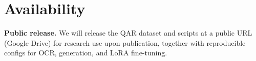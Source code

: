 \documentclass[sigconf,authordraft,anonymous]{acmart}
\begin{document}
\section{Availability}
\textbf{Public release.} We will release the QAR dataset and scripts at a public URL (Google Drive) for research use upon publication, together with reproducible configs for OCR, generation, and LoRA fine-tuning.








\appendix
\end{document}
